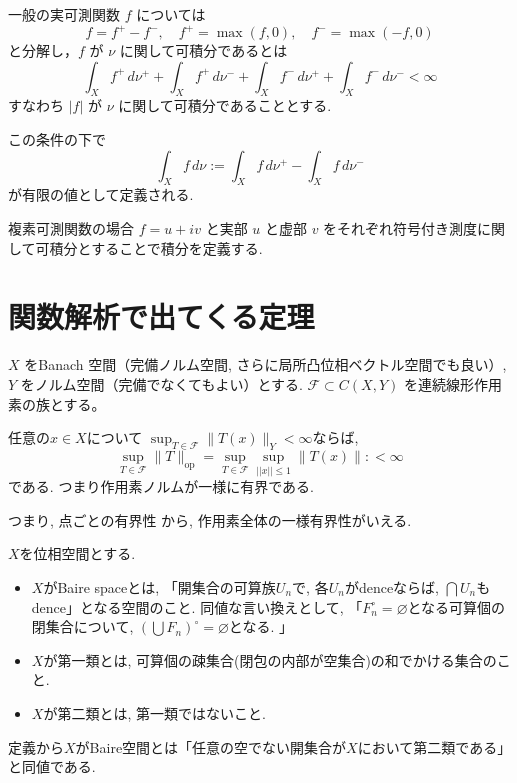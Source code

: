 一般の実可測関数 \(f\) については
\[
f = f^+ - f^-, \quad f^+ = \max(f,0), \quad f^- = \max(-f,0)
\]
と分解し，\(f\) が \(\nu\) に関して可積分であるとは
\[
\int_X f^+ \, d\nu^+ + \int_X f^+ \, d\nu^- + \int_X f^- \, d\nu^+ + \int_X f^- \, d\nu^- < \infty
\]
すなわち \(|f|\) が \(\nu\) に関して可積分であることとする. 

この条件の下で
\[
\int_X f \, d\nu := \int_X f \, d\nu^+ - \int_X f \, d\nu^-
\]
が有限の値として定義される. 

複素可測関数の場合 \(f = u + iv\) と実部 \(u\) と虚部 \(v\) をそれぞれ符号付き測度に関して可積分とすることで積分を定義する. 

\section*{関数解析で出てくる定理}

\begin{tcolorbox}[mybox]
\begin{thm}
\(X\) をBanach 空間（完備ノルム空間, さらに局所凸位相ベクトル空間でも良い）,   
\(Y\) をノルム空間（完備でなくてもよい）とする. 
\(\mathcal{F} \subset C(X,Y)\) を連続線形作用素の族とする。

任意の$x \in X$について
\(\sup_{T \in \mathcal{F}} \|T(x)\|_Y < \infty\)ならば, 
\[
\sup_{T \in \mathcal{F}} \|T\|_{\mathrm{op}}= 
\sup_{T \in \mathcal{F}} \sup_{|| x || \le 1}\|T (x)\|:
< \infty
\]
である. つまり作用素ノルムが一様に有界である. 
\end{thm}
\end{tcolorbox}
つまり, 点ごとの有界性%
から, 作用素全体の一様有界性がいえる. %


\begin{tcolorbox}[mybox]
\begin{defn}
$X$を位相空間とする.
\begin{itemize}
\item $X$がBaire spaceとは, 「開集合の可算族$U_n$で, 各$U_n$がdenceならば, $\bigcap U_n$もdence」となる空間のこと. 同値な言い換えとして, 「$F_{n}^{\circ}=\varnothing$となる可算個の閉集合について, $(\bigcup F_n)^{\circ} = \varnothing$となる. 」
\item $X$が第一類とは, 可算個の疎集合(閉包の内部が空集合)の和でかける集合のこと. 
\item$X$が第二類とは, 第一類ではないこと. 
\end{itemize}
定義から$X$がBaire空間とは「任意の空でない開集合が$X$において第二類である」と同値である. 
\end{defn}
\end{tcolorbox}



